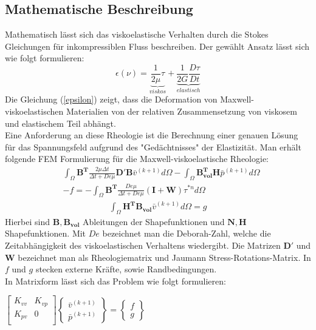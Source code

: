 \documentclass[12pt]{article}
\begin{document}
\subsection{Mathematische Beschreibung}
Mathematisch lässt sich das viskoelastische Verhalten durch die Stokes Gleichungen für inkompressiblen Fluss beschreiben. Der gewählt Ansatz lässt sich wie folgt formulieren:
\begin{equation}
	\epsilon (\nu) = \underbrace{\frac{1}{2\mu}\tau}_{viskos} + \underbrace{\frac{1}{2G}\frac{D\tau}{Dt}}_{elastisch}
	\label{epsilon}
\end{equation}
Die Gleichung (\ref{epsilon}) zeigt, dass die Deformation von Maxwell-viskoelastischen Materialien von der relativen Zusammensetzung von viskosem und elastischem Teil abhängt.
\\
Eine Anforderung an diese Rheologie ist die Berechnung einer genauen Lösung für das Spannungsfeld aufgrund des "Gedächtnisses" der Elastizität.
Man erhält folgende FEM Formulierung für die Maxwell-viskoelastische Rheologie:
		\begin{align*}
&\int_{\Omega} \boldsymbol{B^T} \frac{2\mu \Delta t}{\Delta t + De\mu} \boldsymbol{D'} \boldsymbol{B} \bar{v}^{(k+1)} d\Omega -  \int_{\Omega} \boldsymbol{B^T_{vol}} \boldsymbol{H} \bar{p}^{(k+1)} d\Omega \\ 
&-f  = -\int_{\Omega} \boldsymbol{B^T} \frac{De\mu}{\Delta t + De\mu}(\boldsymbol{I}+\boldsymbol{W})\tau^{*n} d\Omega
\end{align*}
\begin{align*}
\int_{\Omega} \boldsymbol{H^T} \boldsymbol{B_{vol}}  \bar{v}^{(k+1)} d\Omega = g
\end{align*}
Hierbei sind $\boldsymbol{B}, \boldsymbol{B_{vol}}$ Ableitungen der Shapefunktionen und $\boldsymbol{N}, \boldsymbol{H}$ Shapefunktionen. Mit $De$ bezeichnet man die Deborah-Zahl, welche die Zeitabhängigkeit des viskoelastischen Verhaltens wiedergibt. Die Matrizen $\boldsymbol{D'}$ und $\boldsymbol{W}$ bezeichnet man als Rheologiematrix und Jaumann Stress-Rotations-Matrix. In $f$ und $g$ stecken externe Kräfte, sowie Randbedingungen.
\\
In Matrixform lässt sich das Problem wie folgt formulieren: \\
\newline
\begin{center}
	$\begin{bmatrix}
	K_{vv} & K_{vp} \\
	K_{pv} & 0 \\
	\end{bmatrix}
	\begin{Bmatrix}
	\bar{v}^{(k+1)} \\
	\bar{p}^{(k+1)}
	\end{Bmatrix}
	= \begin{Bmatrix}
	f \\
	g
	\end{Bmatrix}$
\end{center}
\end{document}
